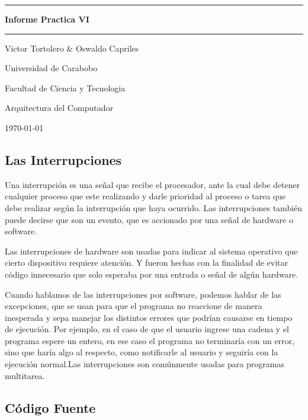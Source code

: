 \documentclass{article}
\begin{document}
\begin{centering}
\hrule 	\vspace{0.4cm}
	{ \Huge \bfseries Informe Practica VI \\[0.4cm] }
\hrule \vfill
\end{centering}

\noindent
\centerline{Victor Tortolero \& Oswaldo Capriles} \newline

\vspace{8cm}
\centerline{Universidad de Carabobo}
\centerline{Facultad de Ciencia y Tecnologia}
\centerline{Arquitectura del Computador}
\centerline{\today}

\newpage


\begin{centering} \section{Las Interrupciones} \end{centering}
	Una interrupción es una señal que recibe el procesador, ante la cual debe detener cualquier proceso que este realizando y darle prioridad al proceso o tarea que debe realizar según la interrupción que haya ocurrido. Las interrupciones también puede decirse que son un evento, que es accionado por una señal de hardware o software. 
	
	Las interrupciones de hardware son usadas para indicar al sistema operativo que cierto dispositivo requiere atención. Y fueron hechas con la finalidad de evitar código innecesario que solo esperaba por una entrada o señal de algún hardware.
	
	Cuando hablamos de las interrupciones por software, podemos hablar de las excepciones, que se usan para que el programa no reaccione de manera inesperada y sepa manejar los distintos errores que podrían causarse en tiempo de ejecución. Por ejemplo, en el caso de que el usuario ingrese una cadena y el programa espere un entero, en ese caso el programa no terminaría con un error, sino que haría algo al respecto, como notificarle al usuario y seguiría con la ejecución normal.Las interrupciones son comúnmente usadas para programas multitarea.
\newpage
	


\newpage
\begin{centering} \section{Código Fuente} \end{centering}
\end{document}
